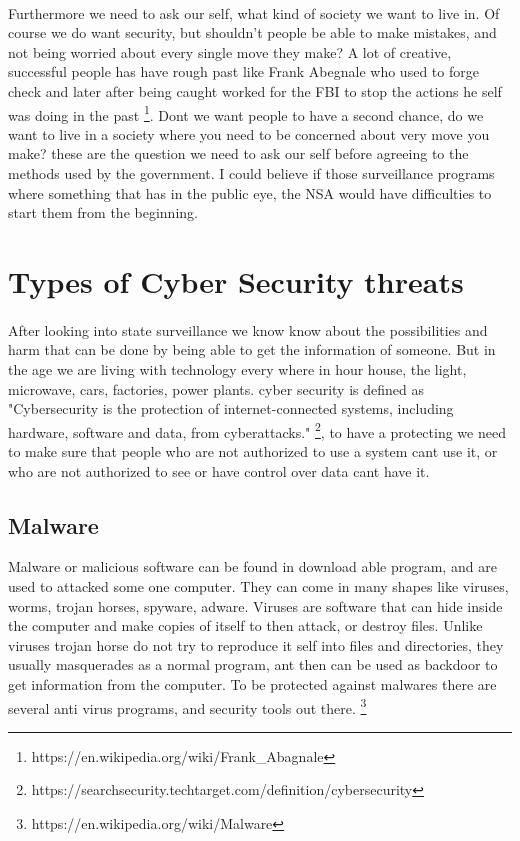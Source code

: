 \documentclass{article}
\begin{document}
\paragraph{}
Furthermore we need to ask our self, what kind of society we want to live in. Of course we do want security, but shouldn't people be able to make mistakes, and not being worried about every single move they make? A lot of creative, successful people has have rough past like Frank Abegnale who used to forge check and later after being caught worked for the FBI to stop the actions he self was doing in the past \footnote{https://en.wikipedia.org/wiki/Frank\_Abagnale}. Dont we want people to have a second chance, do we want to live in a society where you need to be concerned about very move you make? these are the question we need to ask our self before agreeing to the methods used by the government. I could believe if those surveillance programs where something that has in the public eye, the NSA would have difficulties to start them from the beginning.

\newpage
\section{Types of Cyber Security threats}
\paragraph{}
After looking into state surveillance we know know about the possibilities and harm that can be done by being able to get the information of someone. But in the age we are living with technology every where in hour house, the light, microwave, cars, factories, power plants. cyber security is defined as "Cybersecurity is the protection of internet-connected systems, including hardware, software and data, from cyberattacks." \footnote{https://searchsecurity.techtarget.com/definition/cybersecurity}, to have a protecting we need to make sure that people who are not authorized to use a system cant use it, or who are not authorized to see or have control over data cant have it. 

\subsection{Malware}
Malware or malicious software can be found in download able program, and are used to attacked some one computer. They can come in many shapes like viruses, worms, trojan horses, spyware, adware. Viruses are software that can hide inside the computer and make copies of itself to then attack, or destroy files. Unlike viruses trojan horse do not try to reproduce it self into files and directories, they usually masquerades as a normal program, ant then can be used as backdoor to get information from the computer. To be protected against malwares there are several anti virus programs, and security tools out there. \footnote{https://en.wikipedia.org/wiki/Malware}
\end{document}
